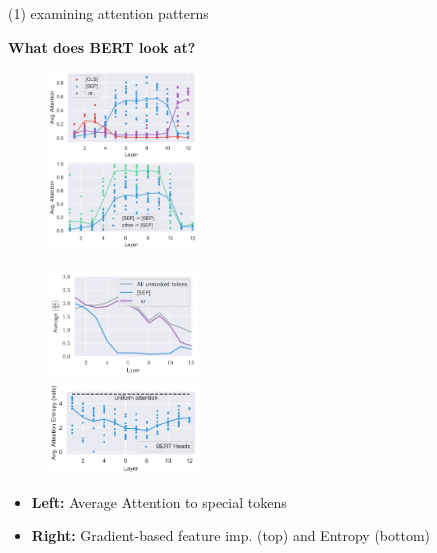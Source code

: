 \begin{frame}{(1) examining attention patterns}

\vfill

\textbf{What does BERT look at?} 

\begin{minipage}{.49\textwidth}
	\begin{figure}
		\centering
		\includegraphics[width = 4cm]{figure/51-special-tokens.png}
	\end{figure}
\end{minipage}%
\begin{minipage}{.49\textwidth}
	\begin{figure}
		\centering
		\includegraphics[width = 4cm]{figure/51-featimp.png}\\
		\includegraphics[width = 4cm]{figure/51-attn-entropy.png}
	\end{figure}
\end{minipage}
	
\begin{itemize}
		\item \textbf{Left:} Average Attention to special tokens
		\item \textbf{Right:} Gradient-based feature imp. (top) and Entropy (bottom)
\end{itemize}
	
\vfill

\end{frame}

